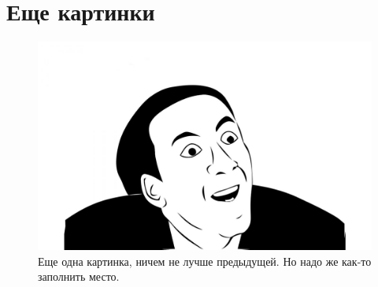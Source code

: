 \chapter{Еще картинки}
\label{cha:appendix2}

\begin{figure}
\centering
\includegraphics[width=\textwidth]{assets/cage.jpg}
\caption{Еще одна картинка, ничем не лучше предыдущей. Но надо же как-то заполнить место.}
\end{figure}

